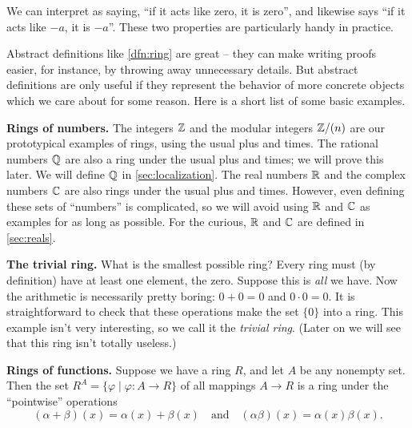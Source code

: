 We can interpret  as saying, ``if it acts like zero, it is zero'', and likewise  says ``if it acts like \(-a\), it is \(-a\)''.
These two properties are particularly handy in practice.

Abstract definitions like \ref{dfn:ring} are great -- they can make writing proofs easier, for instance, by throwing away unnecessary details.
But abstract definitions are only useful if they represent the behavior of more concrete objects which we care about for some reason.
Here is a short list of some basic examples.

\begin{examples}
\item \textbf{Rings of numbers.} \label{examp:numbers} The integers \(\mathbb{Z}\) and the modular integers \(\mathbb{Z}/(n)\) are our prototypical examples of rings, using the usual plus and times.
The rational numbers \(\mathbb{Q}\) are also a ring under the usual plus and times; we will prove this later.
We will define \(\mathbb{Q}\) in \autoref{sec:localization}.
The real numbers \(\mathbb{R}\) and the complex numbers \(\mathbb{C}\) are also rings under the usual plus and times.
However, even defining these sets of ``numbers'' is complicated, so we will avoid using \(\mathbb{R}\) and \(\mathbb{C}\) as examples for as long as possible.
For the curious, \(\mathbb{R}\) and \(\mathbb{C}\) are defined in \autoref{sec:reals}.

\item \textbf{The trivial ring.} \label{examp:zero-ring} What is the smallest possible ring?
Every ring must (by definition) have at least one element, the zero.
Suppose this is \emph{all} we have.
Now the arithmetic is necessarily pretty boring: \(0+0 = 0\) and \(0 \cdot 0 = 0\).
It is straightforward to check that these operations make the set \(\{0\}\) into a ring.
This example isn't very interesting, so we call it the \emph{trivial ring}.
(Later on we will see that this ring isn't totally useless.)

\item \textbf{Rings of functions.} \label{examp:rings-of-functions} Suppose we have a ring \(R\), and let \(A\) be any nonempty set.
Then the set \(R^A = \{ \varphi \mid \varphi : A \rightarrow R \}\) of all mappings \(A \rightarrow R\) is a ring under the ``pointwise'' operations \[ (\alpha + \beta)(x) = \alpha(x) + \beta(x) \quad \mathrm{and} \quad (\alpha\beta)(x) = \alpha(x) \beta(x). \]


\end{examples}

